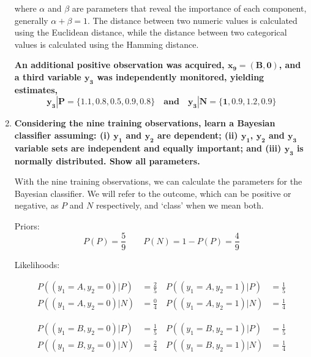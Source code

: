 \documentclass[12pt]{article}
\begin{document}
\begin{enumerate}[leftmargin=\labelsep]
    where $\alpha$ and $\beta$ are parameters that reveal the importance of each component, generally $\alpha + \beta = 1$.  
    The distance between two numeric values is calculated using the Euclidean distance, while the distance between two categorical values is calculated using the Hamming distance.
    
    \vspace{15pt}
    \textbf{An additional positive observation was acquired, $\boldsymbol{x_9 = (B,0)}$, and a third variable $\boldsymbol{y_3}$
    was independently monitored, yielding estimates,}
    \[
    \boldsymbol{y_3|P = \{1.1, 0.8, 0.5, 0.9, 0.8\} \quad and \quad y_3|N = \{1, 0.9, 1.2, 0.9\}}
    \]

    \item \textbf{Considering the nine training observations, learn a Bayesian classifier assuming:
    (i) $\boldsymbol{y_1}$ and $\boldsymbol{y_2}$ are dependent; (ii) {$\boldsymbol{y_1}$, $\boldsymbol{y_2}$} and {$\boldsymbol{y_3}$} variable sets are independent and equally
    important; and (iii) $\boldsymbol{y_3}$ is normally distributed. Show all parameters.}

    \vspace{10pt} 
    With the nine training observations, we can calculate the parameters for the Bayesian classifier.
    We will refer to the outcome, which can be positive or negative, as $P$ and $N$ respectively, and `class' when we mean both.

    \vspace{10pt}
    Priors:
    \begin{equation*}
        P(P) = \frac{5}{9} \quad \quad P(N) = 1- P(P) = \frac{4}{9} 
    \end{equation*}

    Likelihoods:

    \begin{equation*}
        \begin{aligned}
        P((y_1 = A, y_2 = 0)|P) &= \frac{2}{5} \quad  P((y_1= A, y_2 = 1)|P) &= \frac{1}{5} 
        \\
        P((y_1 = A, y_2 = 0)|N) &= \frac{0}{4} \quad  P((y_1 = A, y_2= 1)|N) &= \frac{1}{4} 
        \end{aligned}
    \end{equation*}

    \begin{equation*}
        \begin{aligned}
        P((y_1 = B, y_2 = 0)|P) &= \frac{1}{5} \quad  P((y_1 = B, y_2 = 1)|P) &= \frac{1}{5} 
        \\
        P((y_1 = B, y_2 = 0)|N) &= \frac{2}{4} \quad  P((y_1 = B, y_2 = 1)|N) &= \frac{1}{4} 
        \end{aligned}
    \end{equation*}


\end{enumerate}
\end{document}
